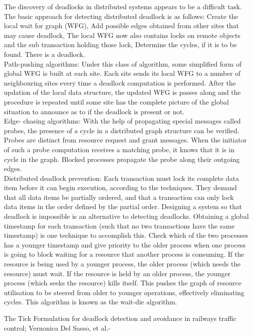\documentclass[sigplan,screen]{acmart}
\begin{document}
The discovery of deadlocks in distributed systems appears to be a difficult task.
The basic approach for detecting distributed deadlock is as follows:
Create the local wait for graph (WFG), Add possible edges
obtained from other sites that may cause deadlock, The local
WFG now also contains locks on remote objects and the sub
transaction holding those lock, Determine the cycles, if it is
to be found. There is a deadlock.
\\
Path-pushing algorithms: Under this class of algorithm, some simplified form of global WFG is built at each site. Each site sends its local WFG to a number of neighbouring sites every time a deadlock computation is performed. After the updation of the local data structure, the updated WFG is passes along and the procedure is repeated until some site has the complete picture of the global situation to announce as to if the deadlock is present or not. 
\\
Edge- chasing algorithms: With the help of propagating special messages called probes, the presence of a cycle in a distributed graph structure can be verified. Probes are distinct from resource request and grant messages. When the initiator of such a probe
computation receives a matching probe, it knows that it is in cycle in the graph. Blocked processes propagate the probe along their
outgoing edges. 
\\
Distributed deadlock prevention: Each transaction must lock its complete data item before it can begin execution, according to the techniques. They demand that all data items be partially ordered, and that a transaction can only lock data items in the order defined by the partial order.
Designing a system so that deadlock is impossible is an alternative to detecting deadlocks. Obtaining a global timestamp for each transaction (such that no two transactions have the same timestamp) is one technique to accomplish this. Check which of the two processes has a younger timestamp and give priority to the older process when one process is going to block waiting for a resource that another process is consuming.
If the resource is being used by a younger process, the older process (which needs the resource) must wait. If the resource is held by an older process, the younger process (which seeks the resource) kills itself. This pushes the graph of resource utilisation to be steered from older to younger operations, effectively eliminating cycles. This algorithm is known as the wait-die algorithm.
\par
The Tick Formulation for deadlock detection and avoidance in railways traffic control; Vernonica Del Sasso, et al.-
\end{document}
